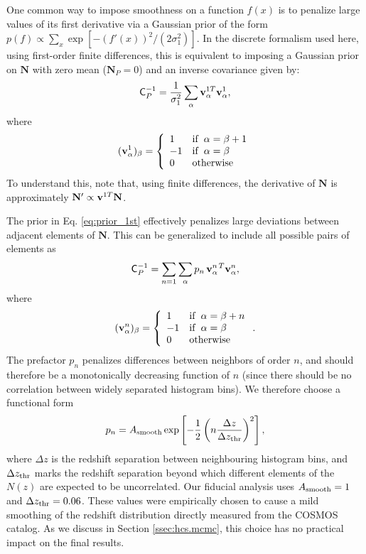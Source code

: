 \documentclass[a4paper,11pt]{article}
\newcommand{\vN}{\mathbf{N}}
\begin{document}
      One common way to impose smoothness on a function $f(x)$ is to penalize large values of its first derivative via a Gaussian prior of the form $p(f)\propto\sum_x\exp\left[-(f'(x))^2/(2\sigma_1^2)\right]$. In the discrete formalism used here, using first-order finite differences, this is equivalent to imposing a Gaussian prior on $\vN$ with zero mean ($\vN_P=0$) and an inverse covariance given by:
      \begin{equation}\label{eq:prior_1st}
        {\sf C}^{-1}_P=\frac{1}{\sigma_1^2}\sum_\alpha {\bf v}^{1T}_\alpha{\bf v}^1_\alpha,
      \end{equation}
      where
      \begin{equation}
        ({\bf v}^1_\alpha)_\beta=\left\{
        \begin{array}{ll}
          1  & {\rm if}\,\,\, \alpha=\beta+1\\
          -1  &  {\rm if}\,\,\, \alpha=\beta\\
          0 & {\rm otherwise}
        \end{array}\right.
      \end{equation}
      To understand this, note that, using finite differences, the derivative of $\vN$ is approximately $\vN'\propto {\bf v}^{1T}\vN$.

      The prior in Eq. \ref{eq:prior_1st} effectively penalizes large deviations between adjacent elements of $\vN$. This can be generalized to include all possible pairs of elements as
      \begin{equation}\label{eq:smooth1}
        {\sf C}^{-1}_P=\sum_{n=1}\sum_{\alpha}p_n\,{\bf v}^{n\,T}_\alpha{\bf v}^n_\alpha,
      \end{equation}
      where
      \begin{equation}
        ({\bf v}^n_\alpha)_\beta=\left\{
        \begin{array}{ll}
          1  & {\rm if}\,\,\, \alpha=\beta+n\\
          -1  &  {\rm if}\,\,\, \alpha=\beta\\
          0 & {\rm otherwise}
        \end{array} \right..
      \end{equation}
      The prefactor $p_n$ penalizes differences between neighbors of order $n$, and should therefore be a monotonically decreasing function of $n$ (since there should be no correlation between widely separated histogram bins). We therefore choose a functional form
      \begin{equation}
        p_n=A_{\rm smooth}\,{\rm exp}\left[-\frac{1}{2}\left(n\frac{\Delta z}{\Delta z_{\rm thr}}\right)^2\right],
      \end{equation}
      where $\Delta z$ is the redshift separation between neighbouring histogram bins, and $\Delta z_{\rm thr}$ marks the redshift separation beyond which different elements of the $N(z)$ are expected to be uncorrelated. Our fiducial analysis uses $A_{\rm smooth}=1$ and $\Delta z_{\rm thr}=0.06$. These values were empirically chosen to cause a mild smoothing of the redshift distribution directly measured from the COSMOS catalog. As we discuss in Section \ref{ssec:hcs.mcmc}, this choice has no practical impact on the final results.
    
\end{document}
